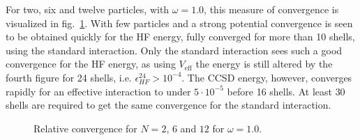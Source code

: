 For two, six and twelve particles, with $\omega = 1.0$, this measure of convergence is visualized in fig.~\ref{fig:results:convN2OM1}.
With few particles and a strong potential convergence is seen to be obtained quickly for the HF energy, fully converged for more than 10 shells, using the standard interaction.
Only the standard interaction sees such a good convergence for the HF energy, as using $V_{\textrm{eff}}$ the energy is still altered by the fourth figure for 24 shells, i.e. $\epsilon^{24}_{HF} >  10^{-4}$.
The CCSD energy, however, converges rapidly for an effective interaction to under $5\cdot 10^{-5}$ before 16 shells.
At least $30$ shells are required to get the same convergence for the standard interaction.
\begin{figure}
\begin{center}
\caption{Relative convergence for $N=2$, $6$ and $12$ for $\omega =1.0$.}
\label{fig:results:convN2OM1}
\end{center}
\end{figure}

